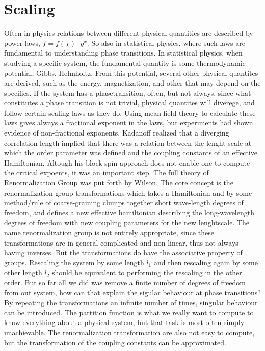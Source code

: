 \section{Scaling}
Often in physics relations between different physical quantities are described by power-laws, $f = f(\chi)\cdot g^{x}$. So also in statistical physics, where such laws are fundamental to understanding phase transitions.
In statistical physics, when studying a specific system, the fundamental quantity is some thermodynamic potential,  Gibbs, Helmholtz. From this potential, several other physical quantites are derived, such as the energy, magnetization, and other that may depend on the specifics. 
If the system has a phasetransition, often, but not always, since what constitutes a phase transition is not trivial, physical quantites will diverege, and follow certain scaling laws as they do. 
Using mean field theory to calculate these laws gives always a fractional exponent in the laws, but experiments had shown evidence of non-fractional exponents. 
Kadanoff realized that a diverging correlation length implied that there was a relation between the lenght scale at which the order parameter was defined and the coupling constants of an effective Hamiltonian. Altough his block-spin approach does not enable one to compute the critical expoents, it was an important step.
The full theory of Renormalization Group was put forth by Wilson.
The core concept is the renormalization group transformations which takes a Hamiltonian and by some method/rule of coarse-graining clumps together short wave-length degrees of freedom, and defines a new effective hamiltonian describing the long-wavelength degrees of freedom with new coupling parameters for the new lenghtscale.
The name renormalization group is not entirely appropriate, since these transformations are in general complicated and non-linear, thus not always having inverses. But the transformations do have the associative property of groups. Rescaling the system by some length $l_1$ and then rescaling again by some other length $l_2$ should be equivalent to performing the rescaling in the other order.
But so far all we did was remove a finite number of degrees of freedom from out system, how can that explain the sigular behaviour at phase transitions? By repeating the transformations an infinite number of times, singular behaviour can be introduced.
The partition function is what we really want to compute to know everything about a physical system, but that task is most often simply unachievable. The renormalization transformation are also not easy to compute, but the transformation of the coupling constants can be approximated.
